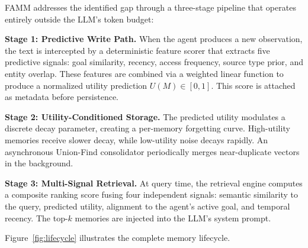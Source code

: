\documentclass[conference]{IEEEtran}
\begin{document}
FAMM addresses the identified gap through a three-stage pipeline that operates entirely outside the LLM's token budget:

\textbf{Stage 1: Predictive Write Path.} When the agent produces a new observation, the text is intercepted by a deterministic feature scorer that extracts five predictive signals: goal similarity, recency, access frequency, source type prior, and entity overlap. These features are combined via a weighted linear function to produce a normalized utility prediction $U(M) \in [0,1]$. This score is attached as metadata before persistence.

\textbf{Stage 2: Utility-Conditioned Storage.} The predicted utility modulates a discrete decay parameter, creating a per-memory forgetting curve. High-utility memories receive slower decay, while low-utility noise decays rapidly. An asynchronous Union-Find consolidator periodically merges near-duplicate vectors in the background.

\textbf{Stage 3: Multi-Signal Retrieval.} At query time, the retrieval engine computes a composite ranking score fusing four independent signals: semantic similarity to the query, predicted utility, alignment to the agent's active goal, and temporal recency. The top-$k$ memories are injected into the LLM's system prompt.

Figure~\ref{fig:lifecycle} illustrates the complete memory lifecycle.
\end{document}
